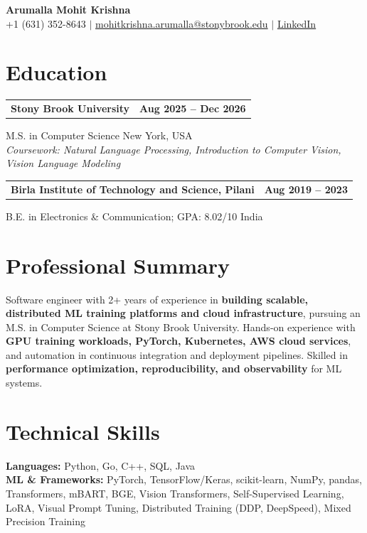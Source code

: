 \documentclass[letterpaper,10pt]{article}
\makeatletter
\newcommand{\entry}[2]{%
  \noindent
  \begin{tabularx}{\linewidth}
    {@{}>{\raggedright\arraybackslash}X@{\hspace{6pt}}r@{}}
    \textbf{#1} & #2
  \end{tabularx}\par
}
\makeatother
\begin{document}
\begin{center}
    {\LARGE\bfseries Arumalla Mohit Krishna}\\[3pt]
    +1 (631) 352-8643 $|$
    \href{mailto:mohitkrishna.arumalla@stonybrook.edu}
    {mohitkrishna.arumalla@stonybrook.edu} $|$
    \href{https://linkedin.com/in/mohit-krishna-arumalla}
    {LinkedIn}
\end{center}
\vspace{-8pt}

\section{Education}

\entry
  {\textbf{Stony Brook University}}
  {\textbf{Aug 2025 -- Dec 2026}}

M.S. in Computer Science \hfill New York, USA\\
\textit{
Coursework: Natural Language Processing,
Introduction to Computer Vision, Vision Language Modeling
}
\vspace{3pt}

\entry
  {\textbf{Birla Institute of Technology and Science, Pilani}}
  {\textbf{Aug 2019 -- 2023}}

B.E. in Electronics \& Communication; GPA: 8.02/10 \hfill India
\section{Professional Summary}

Software engineer with 2+ years of experience in \textbf{building scalable, distributed ML training platforms and cloud infrastructure}, pursuing an M.S. in Computer Science at Stony Brook University. Hands-on experience with \textbf{GPU training workloads, PyTorch, Kubernetes, AWS cloud services}, and automation in continuous integration and deployment pipelines. Skilled in \textbf{performance optimization, reproducibility, and observability} for ML systems.

\section{Technical Skills}

\textbf{Languages:}
Python, Go, C++, SQL, Java\\

\textbf{ML \& Frameworks:}
PyTorch, TensorFlow/Keras, scikit-learn, NumPy, pandas,
Transformers, mBART, BGE, Vision Transformers,
Self-Supervised Learning, LoRA, Visual Prompt Tuning,
Distributed Training (DDP, DeepSpeed), Mixed Precision Training\\
\end{document}
